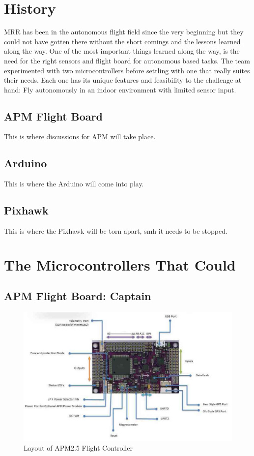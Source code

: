 \documentclass[conference,12pt, ]{IEEEtran}
\begin{document}
\section{History}
MRR has been in the autonomous flight field since the very beginning but they could not have gotten there without the short comings and the lessons learned along the way. One of the most important things learned along the way, is the need for the right sensors and flight board for autonomous based tasks. The team experimented with two microcontrollers before settling with one that really suites their needs. Each one has its unique features and feasibility to the challenge at hand: Fly autonomously in an indoor environment with limited sensor input. 

\subsection{APM Flight Board}
This is where discussions for APM will take place.

\subsection{Arduino}
This is where the Arduino will come into play.

\subsection{Pixhawk}
This is where the Pixhawk will be torn apart, smh it needs to be stopped. 

\section{The Microcontrollers That Could}
\subsection{APM Flight Board: Captain}
\begin{figure}
	\includegraphics[scale=0.40]{apm2.jpg}
	\caption {Layout of APM2.5 Flight Controller}
\end{figure}
\end{document}

